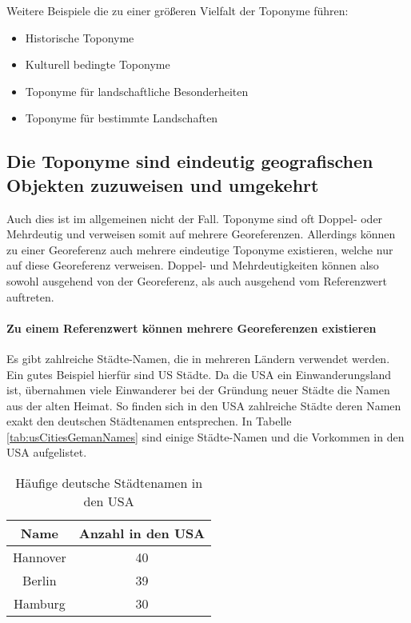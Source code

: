 					Weitere Beispiele die zu einer größeren Vielfalt der Toponyme führen:

					\begin{itemize}
						\item Historische Toponyme
						\item Kulturell bedingte Toponyme
						\item Toponyme für landschaftliche Besonderheiten
						\item Toponyme für bestimmte Landschaften
					\end{itemize}
		
		\subsection{Die Toponyme sind eindeutig geografischen Objekten zuzuweisen und umgekehrt} 

				Auch dies ist im allgemeinen nicht der Fall. 
				Toponyme sind oft Doppel- oder Mehrdeutig und verweisen somit auf mehrere Georeferenzen.
				Allerdings können zu einer Georeferenz auch mehrere eindeutige Toponyme existieren, welche nur auf diese Georeferenz verweisen.
				Doppel- und Mehrdeutigkeiten können also sowohl ausgehend von der Georeferenz, als auch ausgehend vom Referenzwert auftreten.

				\paragraph{Zu einem Referenzwert können mehrere Georeferenzen existieren}

					Es gibt zahlreiche Städte-Namen, die in mehreren Ländern verwendet werden.
					Ein gutes Beispiel hierfür sind US Städte. 
					Da die USA ein Einwanderungsland ist, übernahmen viele Einwanderer bei der Gründung neuer Städte die Namen aus der alten Heimat. 
					So finden sich in den USA zahlreiche Städte deren Namen exakt den deutschen Städtenamen entsprechen. 
					In Tabelle \ref{tab:usCitiesGemanNames} sind einige Städte-Namen und die Vorkommen in den USA aufgelistet.
					
					\begin{table}[htpb]
						\caption{Häufige deutsche Städtenamen in den USA} 
						\centering
						\begin{tabular}{|c|c|}
							\hline
							Name & Anzahl in den USA \\
							\hline\hline
							Hannover & 40 \\
							\hline
							Berlin & 39 \\
							\hline
							Hamburg & 30 \\
							\hline
						\end{tabular}
						\label{tab:usCitiesGermanNames} 
					\end{table}


